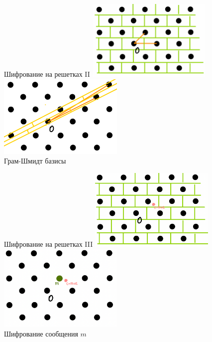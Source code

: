\documentclass[usenames,dvipsnames, 9pt]{beamer}
\begin{document}
{
	\begin{frame}{Шифрование на решетках II}
		\includegraphics[width=0.45\textwidth]{goodbasis2}%
		\hspace{20pt}
		\includegraphics[width=0.45\textwidth]{badbasis2} \\[10pt]
		\Large
		\centering
		Грам-Шмидт базисы
	\end{frame}
}

{
	\begin{frame}{Шифрование на решетках III}
		\includegraphics[width=0.45\textwidth]{goodbasis3}%
		\hspace{20pt}
		\includegraphics[width=0.45\textwidth]{badbasis3} \\[10pt]
		\Large
		\centering
		Шифрование сообщения $m$
	\end{frame}
}
\end{document}

